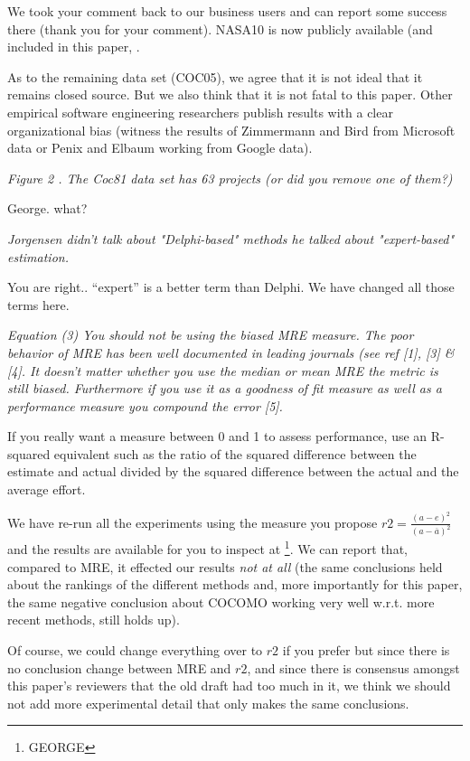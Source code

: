 \documentclass[smallcondesed]{svjour3}
\begin{document}
We took your comment back to our business users and can report some success there (thank you for your comment).
NASA10 is now publicly available (and included in this paper, .

As to the remaining data set (COC05),
we agree that it is not ideal that it remains closed source.  But
we also think that it is not fatal to this paper. 
Other empirical software engineering researchers publish
results with a clear organizational bias (witness the results
of Zimmermann and Bird from Microsoft data
or Penix and Elbaum working from Google data).

{\em Figure 2 . The Coc81 data set has 63 projects (or did you remove one of them?)}

George. what?

{\em Jorgensen didn't talk about "Delphi-based" methods he talked about  "expert-based" estimation.}

You are right.. ``expert'' is a better term than Delphi. We have changed all those terms here.


{\em Equation (3) You should not be using the biased
  MRE measure. The poor behavior of MRE has been
  well documented in leading journals (see ref [1],
  [3] \& [4]. It doesn't matter whether you use the
  median or mean MRE the metric is still
  biased. Furthermore if you use it as a goodness of
  fit measure as well as a performance measure you
  compound the error [5].

  If you really want a measure between 0 and 1 to
  assess performance, use an R-squared equivalent
  such as the ratio of the squared difference
  between the estimate and actual divided by the
  squared difference between the actual and the
  average effort.  }

We have re-run all the experiments using the measure you propose $r2=\frac{(a-e)^2}{(a - \overline{a})^2}$
and the results are available for you to inspect at \footnote{GEORGE}.
We can report that, compared to MRE, it effected our results {\em not at all}
(the same conclusions held about the rankings of the different methods and, more importantly
for this paper, the same negative conclusion about COCOMO working very well w.r.t. more recent methods,
still holds up).

Of course, we could change everything over to $r2$ if you prefer
but since there is no conclusion change between MRE and $r2$, and since there is consensus amongst this paper's
reviewers that the old draft had too much in it, we think we should not
add  more experimental detail that
only makes the same conclusions.
\end{document}
